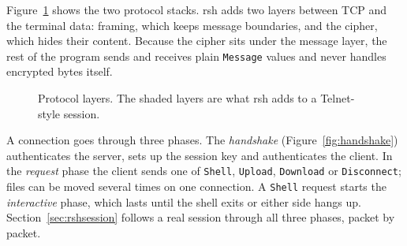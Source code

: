 Figure~\ref{fig:layers} shows the two protocol stacks. rsh adds two layers
between TCP and the terminal data: framing, which keeps message boundaries, and
the cipher, which hides their content. Because the cipher sits under the message
layer, the rest of the program sends and receives plain \texttt{Message}
values and never handles encrypted bytes itself.

\begin{figure}[H]
\centering
{}
\caption{Protocol layers. The shaded layers are what rsh adds to a Telnet-style session.}
\label{fig:layers}
\end{figure}

A connection goes through three phases. The \emph{handshake}
(Figure~\ref{fig:handshake}) authenticates the server, sets up the session key
and authenticates the client. In the \emph{request} phase the client sends one
of \texttt{Shell}, \texttt{Upload}, \texttt{Download} or \texttt{Disconnect};
files can be moved several times on one connection. A \texttt{Shell} request
starts the \emph{interactive} phase, which lasts until the shell exits or
either side hangs up. Section~\ref{sec:rshsession} follows a real session
through all three phases, packet by packet.
